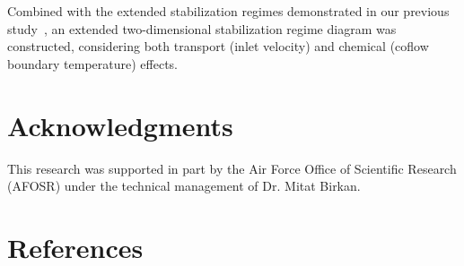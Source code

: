\documentclass[review,3p,times]{elsarticle}
\begin{document}
Combined with the extended stabilization regimes demonstrated in our previous study~\cite{deng15}, an extended two-dimensional stabilization regime diagram was constructed, considering both transport (inlet velocity) and chemical (coflow boundary temperature) effects.  



\section*{Acknowledgments}
This research was supported in part by the Air Force Office of Scientific Research (AFOSR) under the technical management of Dr. Mitat Birkan.


\section*{References}



\renewcommand{\thefigure}{\arabic{figure}}
\renewcommand{\thetable}{\arabic{table}}
\end{document}
